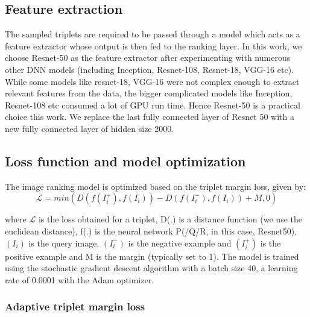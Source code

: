 \subsection{Feature extraction}
The sampled triplets are required to be passed through a model which acts as a feature extractor whose output is then fed to the ranking layer. In this work, we choose Resnet-50 as the feature extractor after experimenting with numerous other DNN models (including Inception, Resnet-108, Resnet-18, VGG-16 etc). While some models like resnet-18, VGG-16 were not complex enough to extract relevant features from the data, the bigger complicated models like Inception, Resnet-108 etc consumed a lot of GPU run time. Hence Resnet-50 is a practical choice this work. We replace the last fully connected layer of Resnet 50 with a new fully connected layer of hidden size 2000.

\subsection{Loss function and model optimization}

The image ranking model is optimized based on the triplet margin loss, given by: 
\begin{equation}\label{eqn1}
\mathcal{L} =  min(D(f(I_{i}^{+}), f(I_{i})) - D(f(I_{i}^{-}), f(I_{i})) + M, 0)
\end{equation}

where $\mathcal{L}$ is the loss obtained for a triplet, D(.) is a distance function (we use the euclidean distance), f(.) is the neural network P(/Q/R, in this case, Resnet50), $(I_{i})$ is the query image, $(I_{i}^{-})$ is the negative example and $(I_{i}^{+})$ is the positive example and M is the margin (typically set to 1). The model is trained using the stochastic gradient descent algorithm with a batch size 40, a learning rate of 0.0001 with the Adam optimizer.

\subsubsection{Adaptive triplet margin loss}


